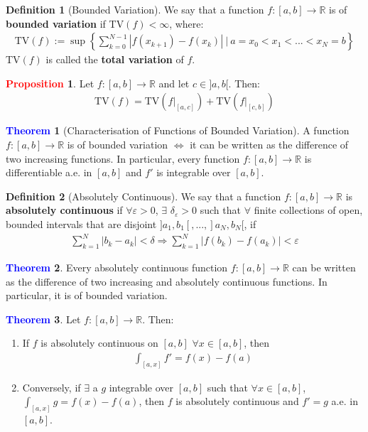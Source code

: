 \documentclass[11pt]{article}
\theoremstyle{definition}
\newcommand{\bb}[1]{\mathbb{#1}}
\newcommand{\sets}[2]{ \left\{ #1\ |\ #2 \right\}}
\newtheorem{theorem}{\textcolor{blue}{Theorem}}
\theoremstyle{definition}
\newtheorem{definition}{\textcolor{OliveGreen}{Definition}}
\newtheorem{prop}{\textcolor{red}{Proposition}}
\theoremstyle{remark}
\begin{document}
\begin{definition}[Bounded Variation]
	We say that a function $f: [a,b] \rightarrow \bb{R}$ is of \textbf{bounded variation} if TV$(f) < \infty$, where: 
	\begin{align}
		\mbox{TV}(f) := \sup \sets{\sum_{k=0}^{N-1} |f(x_{k+1}) - f(x_k) |}{a= x_0 < x_1 < ... < x_N = b}
	\end{align}
	TV$(f)$ is called the \textbf{total variation} of $f$. 
\end{definition}

\begin{prop} Let $f: [a,b] \rightarrow \bb{R}$ and let $c \in ]a, b[$. Then: 
\begin{align*}
	\mbox{TV}(f) = \mbox{TV}(f|_{[a,c]}) 	+  \mbox{TV}(f|_{[c,b]}) 
\end{align*}
\end{prop}

\begin{theorem}[Characterisation of Functions of Bounded Variation] A function $f: [a,b] \rightarrow \bb{R}$ is of bounded variation $\iff$ it can be written as the difference of two increasing functions. In particular, every function $f: [a, b] \rightarrow \bb{R}$ is differentiable a.e. in $[a,b]$ and $f'$ is integrable over $[a,b]$. 
\end{theorem}

\begin{definition}[Absolutely Continuous]
	We say that a function $f: [a,b] \rightarrow \bb{R}$ is \textbf{absolutely continuous} if $\forall \varepsilon > 0$, $\exists$ $\delta_\varepsilon > 0$ such that $\forall$ finite collections of open, bounded intervals that are disjoint $]a_1, b_1[, ..., ]a_N, b_N[$, if 
	\begin{align*}
		\sum_{k=1}^N |b_k - a_k| < \delta 	\Rightarrow 		\sum_{k=1}^N |f(b_k) - f(a_k) | < \varepsilon	
	\end{align*}
\end{definition}

\begin{theorem}
	Every absolutely continuous function $f: [a,b] \rightarrow \bb{R}$ can be written as the difference of two increasing and absolutely continuous functions. In particular, it is of bounded variation. 
\end{theorem}

\begin{theorem}
	Let $f:[a,b] \rightarrow \bb{R}$. Then: 
	\begin{enumerate}[noitemsep]
		\item If $f$ is absolutely continuous on $[a,b]$ $\forall x \in [a,b]$, then 
		\begin{align*}
			\int_{[a,x]} f' = f(x) - f(a) 	
		\end{align*}
		\item Conversely, if $\exists$ a $g$ integrable over $[a,b]$ such that $\forall x \in [a,b]$, $\int_{[a,x]} g = f(x) - f(a)$, then $f$ is absolutely continuous and $f' = g$ a.e. in $[a,b]$. 
	\end{enumerate}
\end{theorem}
\end{document}
